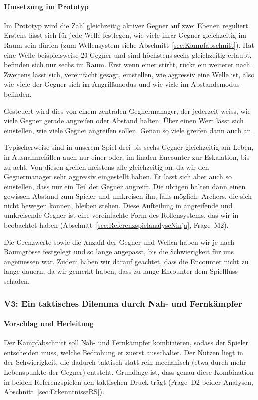 \documentclass[../Main.tex]{subfiles}
\begin{document}
\paragraph{Umsetzung im Prototyp}
Im Prototyp wird die Zahl gleichzeitig aktiver Gegner auf zwei Ebenen reguliert. Erstens lässt sich für jede Welle festlegen, wie viele ihrer Gegner gleichzeitig im Raum sein dürfen (zum Wellensystem siehe Abschnitt~\ref{sec:Kampfabschnitt}). Hat eine Welle beispielsweise 20 Gegner und sind höchstens sechs gleichzeitig erlaubt, befinden sich nur sechs im Raum. Erst wenn einer stirbt, rückt ein weiterer nach. Zweitens lässt sich, vereinfacht gesagt, einstellen, wie aggressiv eine Welle ist, also wie viele der Gegner sich im Angriffsmodus und wie viele im Abstandsmodus befinden.

Gesteuert wird dies von einem zentralen Gegnermanager, der jederzeit weiss, wie viele Gegner gerade angreifen oder Abstand halten. Über einen Wert lässt sich einstellen, wie viele Gegner angreifen sollen. Genau so viele greifen dann auch an.

Typischerweise sind in unserem Spiel drei bis sechs Gegner gleichzeitig am Leben, in Ausnahmefällen auch nur einer oder, im finalen Encounter zur Eskalation, bis zu acht. Von diesen greifen meistens alle gleichzeitig an, da wir den Gegnermanager sehr aggressiv eingestellt haben. Er lässt sich aber auch so einstellen, dass nur ein Teil der Gegner angreift. Die übrigen halten dann einen gewissen Abstand zum Spieler und umkreisen ihn, falls möglich. Archers, die sich nicht bewegen können, bleiben stehen. Diese Aufteilung in angreifende und umkreisende Gegner ist eine vereinfachte Form des Rollensystems, das wir in  beobachtet haben (Abschnitt~\ref{sec:ReferenzspielanalyseNinja}, Frage~M2).

Die Grenzwerte sowie die Anzahl der Gegner und Wellen haben wir je nach Raumgrösse festgelegt und so lange angepasst, bis die Schwierigkeit für uns angemessen war. Zudem haben wir darauf geachtet, dass die Encounter nicht zu lange dauern, da wir gemerkt haben, dass zu lange Encounter dem Spielfluss schaden.

\subsubsection{V3: Ein taktisches Dilemma durch Nah- und Fernkämpfer} \label{sec:V3}

\paragraph{Vorschlag und Herleitung}
Der Kampfabschnitt soll Nah- und Fernkämpfer kombinieren, sodass der Spieler entscheiden muss, welche Bedrohung er zuerst ausschaltet. Der Nutzen liegt in der Schwierigkeit, die dadurch taktisch statt rein mechanisch (etwa durch mehr Lebenspunkte der Gegner) entsteht. Grundlage ist, dass genau diese Kombination in beiden Referenzspielen den taktischen Druck trägt (Frage~D2 beider Analysen, Abschnitt~\ref{sec:ErkenntnisseRS}).
\end{document}
